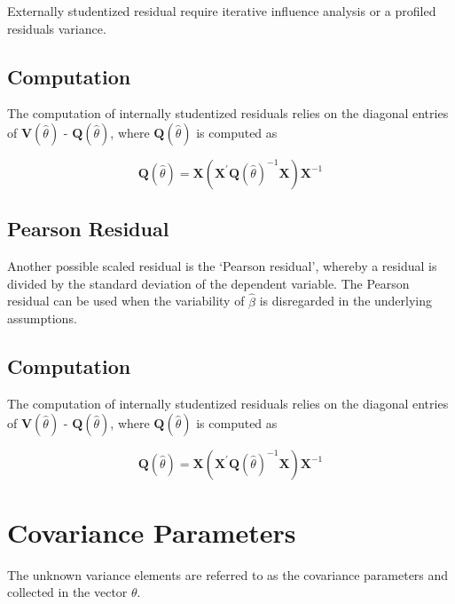 \documentclass[Main.tex]{subfiles}
\begin{document}
	Externally  studentized residual require iterative influence analysis or a profiled residuals variance.
	

	\subsection{Computation}%
	
	The computation of internally studentized residuals relies on the diagonal entries of $\boldsymbol{V} (\hat{\theta})$ - $\boldsymbol{Q} (\hat{\theta})$, where $\boldsymbol{Q} (\hat{\theta})$ is computed as
	
	\[ \boldsymbol{Q} (\hat{\theta}) = \boldsymbol{X} ( \boldsymbol{X}^{\prime}\boldsymbol{Q} (\hat{\theta})^{-1}\boldsymbol{X})\boldsymbol{X}^{-1} \]
	
\subsection{Pearson Residual}%

Another possible scaled residual is the  `Pearson residual', whereby a residual is divided by the standard deviation of the dependent variable. The Pearson residual can be used when the variability of $\hat{\beta}$ is disregarded in the underlying assumptions.


\subsection{Computation}%

The computation of internally studentized residuals relies on the diagonal entries of $\boldsymbol{V} (\hat{\theta})$ - $\boldsymbol{Q} (\hat{\theta})$, where $\boldsymbol{Q} (\hat{\theta})$ is computed as

\[ \boldsymbol{Q} (\hat{\theta}) = \boldsymbol{X} ( \boldsymbol{X}^{\prime}\boldsymbol{Q} (\hat{\theta})^{-1}\boldsymbol{X})\boldsymbol{X}^{-1} \]



\section{Covariance Parameters} %
The unknown variance elements are referred to as the covariance parameters and collected in the vector $\theta$.



\end{document}
